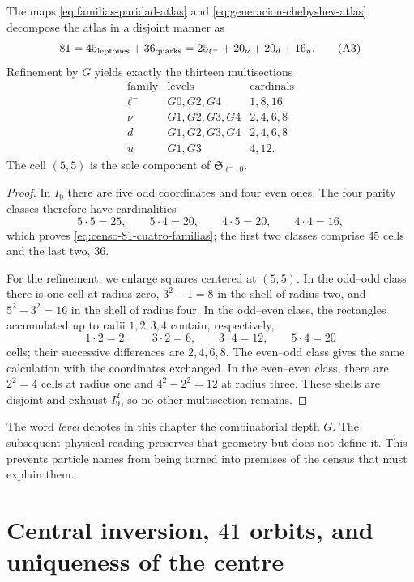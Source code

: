 \begin{theorem}
\label{thm:censo-atlas-81}
The maps \eqref{eq:familias-paridad-atlas} and
\eqref{eq:generacion-chebyshev-atlas} decompose the atlas in a
disjoint manner as
\[
 81=45_{\rm leptones}+36_{\rm quarks}
   =25_{\ell^-}+20_{\nu}+20_{d}+16_{u}.
 \tag{A3}\label{eq:censo-81-cuatro-familias}
\]
Refinement by \(G\) yields exactly the thirteen multisections
\[
\begin{array}{c|c|c}
\text{family}&\text{levels}&\text{cardinals}\\ \hline
\ell^-&G0,G2,G4&1,8,16\\
\nu&G1,G2,G3,G4&2,4,6,8\\
d&G1,G2,G3,G4&2,4,6,8\\
u&G1,G3&4,12.
\end{array}
\tag{A4}\label{eq:trece-multisecciones-atlas}
\]
The cell \((5,5)\) is the sole component of
\(\mathfrak S_{\ell^-,0}\).
\end{theorem}

\begin{proof}
In \(I_9\) there are five odd coordinates and four even ones.  The four parity
classes therefore have cardinalities
\[
 5\cdot5=25,\qquad
 5\cdot4=20,\qquad
 4\cdot5=20,\qquad
 4\cdot4=16,
\]
which proves \eqref{eq:censo-81-cuatro-familias}; the first two
classes comprise \(45\) cells and the last two, \(36\).

For the refinement, we enlarge squares centered at \((5,5)\).
In the odd--odd class there is one cell at radius zero, \(3^2-1=8\)
in the shell of radius two, and \(5^2-3^2=16\) in the shell of radius four.
In the odd--even class, the rectangles accumulated up to radii
\(1,2,3,4\) contain, respectively,
\[
 1\cdot2=2,\qquad 3\cdot2=6,\qquad
 3\cdot4=12,\qquad5\cdot4=20
\]
cells; their successive differences are \(2,4,6,8\). The
even--odd class gives the same calculation with the coordinates exchanged. In the
even--even class, there are \(2^2=4\) cells at radius one and
\(4^2-2^2=12\) at radius three. These shells are disjoint and exhaust
\(I_9^2\), so no other multisection remains.
\end{proof}

The word \emph{level} denotes in this chapter the combinatorial depth
\(G\).  The subsequent physical reading preserves that geometry but does not
define it.  This prevents particle names from being turned into premises
of the census that must explain them.

\section{Central inversion, \(41\) orbits, and uniqueness of the centre}

